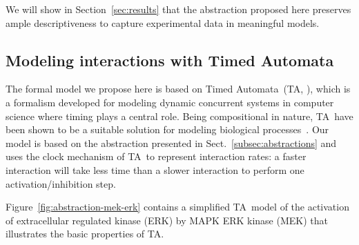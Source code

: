 We will show in Section~\ref{sec:results} that the abstraction proposed here preserves ample
descriptiveness to capture experimental data in meaningful models.


\subsection{Modeling interactions with Timed Automata}\label{subsec:timed-automata}
\def\ta{TA}
\def\tas{TA}

The formal model we propose here is based on Timed Automata~(\tas, \citealt{timed-automata-alur-dill}), which is a
formalism developed for modeling dynamic concurrent systems in computer science where timing plays a central role.
Being compositional in nature, \tas\ have been shown to be a suitable solution for
modeling biological processes~\citep{ta-siebert,bartocci-oscillators,oded-ode-ta-discretization}.
Our model is based on the abstraction presented in Sect.~\ref{subsec:abstractions}
and uses the clock mechanism of \tas\ to represent interaction rates:
a faster interaction will take less time than a slower interaction to perform one activation/inhibition step.

Figure~\ref{fig:abstraction-mek-erk} contains a simplified \tas\ model of the activation of extracellular
regulated kinase (ERK) by MAPK ERK kinase (MEK) that illustrates the basic properties of \tas.



